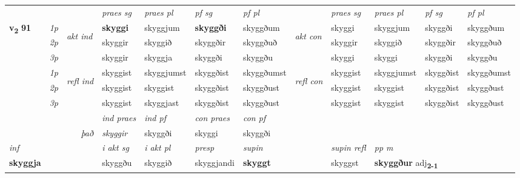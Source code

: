 \begin{longtable}[l]{X>{\footnotesize\itshape}llXXXXlXXXX}
 & &   & \textit{praes sg}  & \textit{praes pl}    & \textit{ pf sg} & \textit{pf pl} & & \textit{praes sg}  & \textit{praes pl}    & \textit{pf sg} & \textit{pf pl }  \\ \cmidrule{4-7} \cmidrule{9-12}
 \multirow{2}{*}{{{\textbf{v{\textsubscript{2}}} \Large{\textbf{91}}}}}  & 1p & \multirow{3}{*}{\begin{turn}{90}\textit{akt ind}\end{turn}} & \textbf{skyggi} & skyggjum & \textbf{skyggði} & skyggðum & \multirow{3}{*}{\begin{turn}{90}\textit{akt con}\end{turn}} &skyggi & skyggjum & skyggði & skyggðum\\*
 & 2p &  &  skyggir  & skyggið & skyggðir & skyggðuð & & skyggir & skyggið & skyggðir & skyggðuð \\*
 & 3p &  & skyggir & skyggja & skyggði & skyggðu & & skyggi & skyggi& skyggði & skyggðu \\*
\cmidrule{4-7} \cmidrule{9-12}
 & 1p & \multirow{3}{*}{\begin{turn}{90}\textit{refl ind}\end{turn}}  & skyggist & skyggjumst & skyggðist & skyggðumst & \multirow{3}{*}{\begin{turn}{90}\textit{refl con}\end{turn}}  &skyggist & skyggjumst & skyggðist & skyggðumst \\*
 & 2p &  & skyggist & skyggist & skyggðist & skyggðust & &skyggist & skyggist & skyggðist & skyggðust \\*
 & 3p  & & skyggist & skyggjast & skyggðist & skyggðust & & skyggist & skyggist& skyggðist & skyggðust \\*
\cmidrule{4-7} \cmidrule{9-12}

   && &  \textit{ind praes} & \textit{ind pf} & \textit{con praes} & \textit{con pf} \\*
\multicolumn{3}{r}{\textit{það}} & skyggir & skyggði & skyggi & skyggði \\*

\cmidrule{4-7}
   {\textit{inf}} & &  & \textit{i akt sg} & \textit{i akt pl}   & \textit{presp} & \textit{supin} && \textit{supin refl} & \textit{pp m} \\*
  {\textbf{skyggja}} & && skyggðu  & skyggið   & skyggjandi &  \textbf{skyggt} && skyggst & \multicolumn{2}{l}{\textbf{skyggður} adj\textbf{\textsubscript{2-1}}} \\*

\midrule


\end{longtable}
